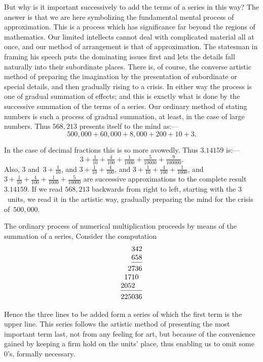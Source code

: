 \documentclass[12pt,leqno]{book}[2005/09/16]
\newcommand{\Chg}[2]{#2}
\newcommand{\Add}[1]{\Chg{}{#1}}
\newcommand{\PageSep}[1]{\ignorespaces}
\newcommand{\Strut}[1][12pt]{\rule{0pt}{#1}}
\begin{document}
But why is it important successively to add
the terms of a series in this way? The answer
is that we are here symbolizing the fundamental
mental process of approximation.
This is a process which has significance far
\PageSep{198}
beyond the regions of mathematics. Our
limited intellects cannot deal with complicated
material all at once, and our method of
arrangement is that of approximation. The
statesman in framing his speech puts the
dominating issues first and lets the details
fall naturally into their subordinate places.
There is, of course, the converse artistic
method of preparing the imagination by the
presentation of subordinate or special details,
and then gradually rising to a crisis. In
either way the process is one of gradual summation
of effects; and this is exactly what
is done by the successive summation of the
terms of a series. Our ordinary method of
stating numbers is such a process of gradual
summation, at least, in the case of large
numbers. Thus $568,213$ presents itself to
the mind as\Add{:}---
\[
500,000 + 60,000 + 8,000 + 200 + 10 + 3\Add{.}
\]

In the case of decimal fractions this is so
more avowedly. Thus $3.14159$ is\Add{:}---
\[
3 + \tfrac{1}{10} + \tfrac{4}{100} + \tfrac{1}{1000} + \tfrac{5}{10000} + \tfrac{9}{100000}\Add{.}
\]
Also, $3$ and~$3 + \frac{1}{10}$, and $3 + \tfrac{1}{10} + \tfrac{4}{100}$, and
$3 + \tfrac{1}{10} + \tfrac{4}{100} + \tfrac{1}{1000}$,
and $3 + \tfrac{1}{10} + \tfrac{4}{100} + \tfrac{1}{1000} + \tfrac{5}{10000}$ are
successive approximations to the complete result
$3.14159$. If we read $568,213$ backwards
from right to left, starting with the $3$~units,
\PageSep{199}
we read it in the artistic way, gradually preparing
the mind for the crisis of~$500,000$.

The ordinary process of numerical multiplication
proceeds by means of the summation
of a series, Consider the computation
\[
\begin{array}{*{6}{@{}c@{}}}
 & & &3&4&2 \\
 & & &6&5&8 \\
\cline{4-6}
\Strut
 & &2&7&3&6 \\
 &1&7&1&0&  \\
2&0&5&2& &  \\
\cline{1-6}
\Strut
2&2&5&0&3&6
\end{array}
\]

Hence the three lines to be added form a
series of which the first term is the upper
line. This series follows the artistic method
of presenting the most important term last,
not from any feeling for art, but because of
the convenience gained by keeping a firm
hold on the units' place, thus enabling us to
omit some~$0$'s, formally necessary.
\end{document}
